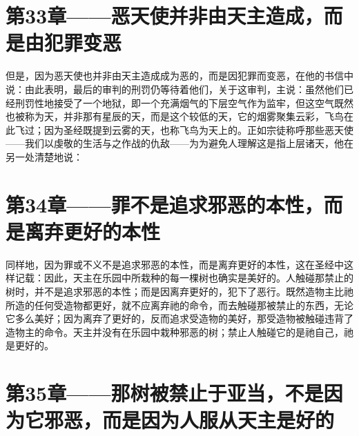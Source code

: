 
\section{第33章——恶天使并非由天主造成，而是由犯罪变恶}

但是，因为恶天使也并非由天主造成成为恶的，而是因犯罪而变恶，在他的书信中说：由此表明，最后的审判的刑罚仍等待着他们，关于这审判，主说：虽然他们已经刑罚性地接受了一个地狱，即一个充满烟气的下层空气作为监牢，但这空气既然也被称为天，并非那有星辰的天，而是这个较低的天，它的烟雾聚集云彩，飞鸟在此飞过；因为圣经既提到云雾的天，也称飞鸟为天上的。正如宗徒称呼那些恶天使——我们以虔敬的生活与之作战的仇敌——为为避免人理解这是指上层诸天，他在另一处清楚地说：\par


\section{第34章——罪不是追求邪恶的本性，而是离弃更好的本性}

同样地，因为罪或不义不是追求邪恶的本性，而是离弃更好的本性，这在圣经中这样记载：因此，天主在乐园中所栽种的每一棵树也确实是美好的。人触碰那禁止的树时，并不是追求邪恶的本性；而是因离弃更好的，犯下了恶行。既然造物主比祂所造的任何受造物都更好，就不应离弃祂的命令，而去触碰那被禁止的东西，无论它多么美好；因为离弃了更好的，反而追求受造物的美好，那受造物被触碰违背了造物主的命令。天主并没有在乐园中栽种邪恶的树；禁止人触碰它的是祂自己，祂是更好的。\par


\section{第35章——那树被禁止于亚当，不是因为它邪恶，而是因为人服从天主是好的}

